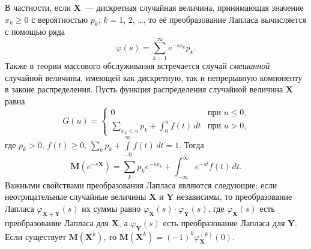 \documentclass[10pt,oneside,final]{book}
\newcommand{\M}{{\mathbf M}}
\begin{document}
В частности, если $\boldsymbol{X}$~--- дискретная случайная величина,
принимающая значение $x_k\geqslant0$ с вероятностью $p_k$, $k=1$, $2$, \ldots{},
то её преобразование Лапласа вычисляется с помощью ряда
\[
\varphi(s)=\sum_{k=1}^\infty e^{-s x_k} p_k.
\]
Также в теории массового обслуживания встречается случай \emph{смешанной}
случайной величины, имеющей как дискретную, так и непрерывную компоненту в законе
распределения. Пусть функция распределения случайной величина $\boldsymbol{X}$
равна
\enlargethispage{3ex}
\[
G(u)=\begin{cases}
  0 & \text{при $u\leqslant0$,}\\
\displaystyle  \sum_{x_k<u} p_k + \int_{0}^u f(t)\,dt  & \text{при $u>0$,}
\end{cases}
\]
где $p_k>0$, $f(t)\geqslant0$, $\sum\limits_{k}p_k+\int\limits_{-0}^\infty
f(t)\,dt=1$. Тогда 
\[
\M(e^{-s\boldsymbol{X}})=\sum_{k}p_ke^{-s x_k}+\int_{-\infty}^\infty e^{-st}
f(t)\,dt.
\]
Важными свойствами преобразования Лапласа являются следующие: если
неотрицательные случайные величины $\boldsymbol{X}$ и $\boldsymbol Y$
независимы, то преобразование Лапласа
$\varphi_{\boldsymbol{X}+\boldsymbol{Y}}(s)$ их суммы равно
$\varphi_{\boldsymbol{X}}(s)\cdot\varphi_{\boldsymbol{Y}}(s)$, где
$\varphi_{\boldsymbol{X}}(s)$ есть преобразование Лапласа для $\boldsymbol{X}$,
а $\varphi_{\boldsymbol{Y}}(s)$ есть преобразование Лапласа для
$\boldsymbol{Y}$. Если существует $\M(\boldsymbol{X}^k)$, то $\M(\boldsymbol{X}^k)=(-1)^k\varphi_{\boldsymbol{X}}^{(k)}(0)$.
\end{document}
